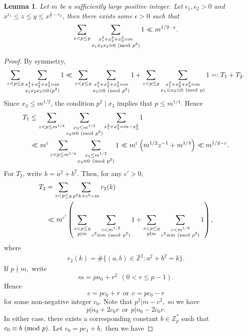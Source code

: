 \documentclass[12pt,a4paper,reqno]{amsart}
\numberwithin{equation}{section}
\def\Z{{\mathbb Z}}
\def\pmod #1{\ ({\rm{mod}}\ #1)}
\theoremstyle{plain}
\newtheorem{lemma}{Lemma}
\theoremstyle{definition}
\begin{document}
\begin{lemma}\label{lem3}
Let $m$ be a sufficiently large positive integer. Let $\epsilon_1, \epsilon_2>0$ and  $x^{\epsilon_1} \leq z \leq y \leq x^{\frac{1}{2}-\epsilon_2}$,
then there exists some $\epsilon>0$ such that
$$\sum_{z<p\leq y}\sum_{\substack{x_1^2+x_2^2+x_3^2 = m \\ x_1x_2x_3 \equiv 0 \pmod{p^2}}} 1\ll m^{1/2-\varepsilon}.$$
\end{lemma}
\begin{proof}
By symmetry,
\[
\sum_{z<p\leq y}\sum_{\substack{x_1^2+x_2^2+x_3^2 = m \\ x_1x_2x_3 \equiv 0 \, (p^2)}} 1 \ll \sum_{z<p\leq y}\sum_{\substack{x_1^2+x_2^2+x_3^2 = m \\ x_3 \equiv 0 \pmod{p^2}}} 1 + \sum_{z<p\leq y}\sum_{\substack{x_1^2+x_2^2+x_3^2 = m \\ x_1 \equiv x_2 \equiv 0 \pmod{p}}} 1 =: T_1 + T_2.
\]
Since $x_3 \leq m^{1/2}$, the condition $p^2 \mid x_3$ implies that $p \leq m^{1/4}$. Hence
\begin{align}\label{20}
T_1
&\leq
\sum_{z<p\leq m^{1/4}}
\sum_{\substack{x_3\leq m^{1/2}\\ x_3\equiv0\pmod {p^2}}}
\sum_{x_1^2+x_2^2=m-x_3^2}1 \notag\\
&\ll
m^\varepsilon
\sum_{z<p\leq m^{1/4}}
\sum_{\substack{x_3\leq m^{1/2}\\ x_3\equiv0\pmod {p^2}}}1
\ll
m^\varepsilon\left(m^{1/2}z^{-1}+m^{1/4}\right)
\ll m^{1/2-\varepsilon}.
\end{align}
For $T_2$, write $k=a^2+b^2$. Then, for any $\epsilon'>0$,
\begin{align*}
T_2
&=\sum_{z<p\leq y}\sum_{p^2k+c^2=m}r_2(k)\\
&\ll m^{\epsilon'}
\left(
\sum_{\substack{z<p\leq y\\ p\mid m}}
\sum_{\substack{c<m^{1/2}\\ c^2\equiv m\pmod {p^2}}}1
+
\sum_{\substack{z<p\leq y\\ p\nmid m}}
\sum_{\substack{c<m^{1/2}\\ c^2\equiv m\pmod {p^2}}}1
\right),
\end{align*}
where
\begin{align*}
r_{2}(k)=\#\{(a,b)\in \mathbb{Z}^{2}:a^{2}+b^{2}=k\}.
\end{align*}
If $p\nmid m,$ write $$m=pn_{0}+r^{2}\ \ (0<r \leq p-1).$$
Hence $$c=pc_{0}+r\ \ \mbox{or}\ \ c=pc_{0}-r$$ for some non-negative integer $c_{0}.$ Note that $p^{2}|m-c^{2},$ so we have
$$p|n_{0}+2c_{0}r\ \ \mbox{or}\ \ p|n_{0}-2c_{0}r.$$ In either case, there exists a corresponding constant $b\in \Z_p^{*}$ such that $c_{0}\equiv b\pmod p.$ Let $c_{0}=pc_{1}+b,$ then we have

\end{proof}
\end{document}
